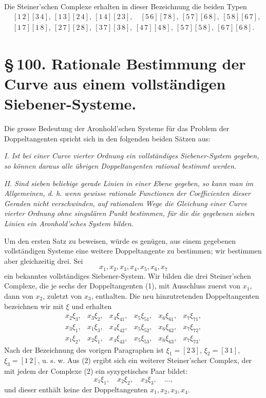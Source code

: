 \documentclass[11pt]{article}
\providecommand{\pair}[2]{[#1\,#2]}
\begin{document}
Die Steiner'schen Complexe erhalten in dieser Bezeichnung die beiden Typen
\begin{align*}
&\pair{1}{2}\pair{3}{4},\ \pair{1}{3}\pair{2}{4},\ \pair{1}{4}\pair{2}{3},\quad
 \pair{5}{6}\pair{7}{8},\ \pair{5}{7}\pair{6}{8},\ \pair{5}{8}\pair{6}{7},\\
&\pair{1}{7}\pair{1}{8},\ \pair{2}{7}\pair{2}{8},\ \pair{3}{7}\pair{3}{8},\ \pair{4}{7}\pair{4}{8},\ \pair{5}{7}\pair{5}{8},\ \pair{6}{7}\pair{6}{8}.
\end{align*}

\section*{\S\,100. Rationale Bestimmung der Curve aus einem vollständigen Siebener-Systeme.}

Die grosse Bedeutung der Aronhold'schen Systeme für das Problem der Doppeltangenten spricht sich in den folgenden beiden Sätzen aus:

\emph{I. Ist bei einer Curve vierter Ordnung ein vollständiges Siebener-System gegeben, so können daraus alle übrigen Doppeltangenten rational bestimmt werden.}

\emph{II. Sind sieben beliebige gerade Linien in einer Ebene gegeben, so kann man im Allgemeinen, d. h. wenn gewisse rationale Functionen der Coefficienten dieser Geraden nicht verschwinden, auf rationalem Wege die Gleichung einer Curve vierter Ordnung ohne singulären Punkt bestimmen, für die die gegebenen sieben Linien ein Aronhold'sches System bilden.}

Um den ersten Satz zu beweisen, würde es genügen, aus einem gegebenen vollständigen Systeme eine weitere Doppeltangente zu bestimmen; wir bestimmen aber gleichzeitig drei. Sei
\begin{equation}
 x_1,x_2,x_3,x_4,x_5,x_6,x_7
 \tag{1}
\end{equation}
ein bekanntes vollständiges Siebener-System. Wir bilden die drei Steiner'schen Complexe, die je sechs der Doppeltangenten (1), mit Ausschluss zuerst von \(x_1\), dann von \(x_2\), zuletzt von \(x_3\), enthalten. Die neu hinzutretenden Doppeltangenten bezeichnen wir mit \(\xi\) und erhalten
\begin{equation}
\begin{array}{llllll}
 x_2\xi_3,&x_3\xi_2,&x_4\xi_{41},&x_5\xi_{51},&x_6\xi_{61},&x_7\xi_{71},\\
 x_3\xi_1,&x_1\xi_3,&x_4\xi_{42},&x_5\xi_{52},&x_6\xi_{62},&x_7\xi_{72},\\
 x_1\xi_2,&x_2\xi_1,&x_4\xi_{43},&x_5\xi_{53},&x_6\xi_{63},&x_7\xi_{73}.
\end{array}
\tag{2}
\end{equation}
Nach der Bezeichnung des vorigen Paragraphen ist \(\xi_1=\pair{2}{3}\), \(\xi_2=\pair{3}{1}\), \(\xi_3=\pair{1}{2}\), u. s. w. Aus (2) ergibt sich ein weiterer Steiner'scher Complex, der mit jedem der Complexe (2) ein syzygetisches Paar bildet:
\begin{equation}
 x_1\xi_1,\quad x_2\xi_2,\quad x_3\xi_3,\quad \ldots,
 \tag{3}
\end{equation}
und dieser enthält keine der Doppeltangenten \(x_1,x_2,x_3,x_4\).
\end{document}
